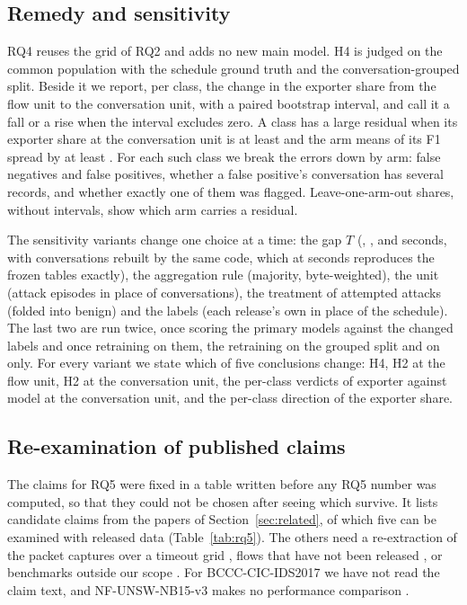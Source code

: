 \subsection{Remedy and sensitivity}\label{sec:rq4method}

RQ4 reuses the grid of RQ2 and adds no new main model. H4 is judged on the common population with the schedule ground truth and the conversation-grouped split. Beside it we report, per class, the change in the exporter share from the flow unit to the conversation unit, with a paired bootstrap interval, and call it a fall or a rise when the interval excludes zero. A class has a large residual when its exporter share at the conversation unit is at least  and the arm means of its F1 spread by at least . For each such class we break the errors down by arm: false negatives and false positives, whether a false positive's conversation has several records, and whether exactly one of them was flagged. Leave-one-arm-out shares, without intervals, show which arm carries a residual.

The sensitivity variants change one choice at a time: the gap $T$ (, ,  and  seconds, with conversations rebuilt by the same code, which at \SetT{} seconds reproduces the frozen tables exactly), the aggregation rule (majority, byte-weighted), the unit (attack episodes in place of conversations), the treatment of attempted attacks (folded into benign) and the labels (each release's own in place of the schedule). The last two are run twice, once scoring the primary models against the changed labels and once retraining on them, the retraining on the grouped split and on \cicids{} only. For every variant we state which of five conclusions change: H4, H2 at the flow unit, H2 at the conversation unit, the per-class verdicts of exporter against model at the conversation unit, and the per-class direction of the exporter share.

\subsection{Re-examination of published claims}\label{sec:claims}

The claims for RQ5 were fixed in a table written before any RQ5 number was computed, so that they could not be chosen after seeing which survive. It lists  candidate claims from the papers of Section~\ref{sec:related}, of which five can be examined with released data (Table~\ref{tab:rq5}). The others need a re-extraction of the packet captures over a timeout grid \cite{janatiidrissi2025}, flows that have not been released \cite{pinto2025,xin2026}, or benchmarks outside our scope \cite{vitorino2025}. For BCCC-CIC-IDS2017 we have not read the claim text, and NF-UNSW-NB15-v3 makes no performance comparison \cite{luay2026}.

